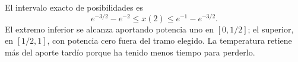 El intervalo exacto de posibilidades es
\[
e^{-3/2}-e^{-2}\le x(2)\le e^{-1}-e^{-3/2}.
\]
El extremo inferior se alcanza aportando potencia uno en \([0,1/2]\); el superior, en \([1/2,1]\), con potencia cero fuera del tramo elegido. La temperatura retiene más del aporte tardío porque ha tenido menos tiempo para perderlo.
